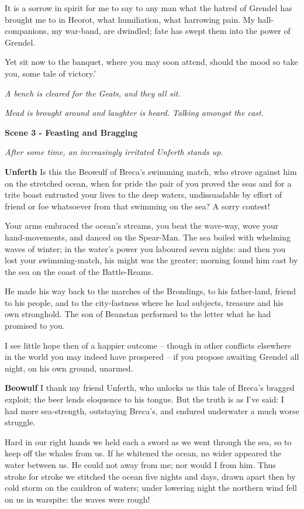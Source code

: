 \documentclass[a4paper]{article}
\begin{document}
{It is a sorrow in spirit for me to say to any man
what the hatred of Grendel has brought me to in Heorot, 
what humiliation, what harrowing pain. 
My hall-companions, my war-band, are dwindled; 
fate has swept them into the power of Grendel.

Yet sit now to the banquet, where you may soon attend,
should the mood so take you, some tale of victory.'

\centerline{\textit{A bench is cleared for the Geats, and they all sit.}}
\centerline{\textit{Mead is brought around and laughter is heard. Talking amongst the cast.}}

\newpage
\centerline{\textbf{Scene 3 - Feasting and Bragging}}
\centerline{\textit{After some time, an increasingly irritated Unferth stands up.}}

\textbf{Unferth} Is this the Beowulf of Breca's swimming match, 
who strove against him on the stretched ocean,
when for pride the pair of you proved the seas
and for a trite boast entrusted your lives
to the deep waters, undissuadable
by effort of friend or foe whatsoever
from that swimming on the sea? A sorry contest!

Your arms embraced the ocean’s streams,
you beat the wave-way, wove your hand-movements,
and danced on the Spear-Man. The sea boiled with whelming
waves of winter; in the water’s power
you laboured seven nights: and then you lost your swimming-match,
his might was the greater; morning found him
cast by the sea on the coast of the Battle-Reams.

He made his way back to the marches of the Brondings,
to his father-land, friend to his people,
and to the city-fastness where he had subjects, treasure
and his own stronghold. The son of Beanstan
performed to the letter what he had promised to you.

I see little hope then of a happier outcome
– though in other conflicts elsewhere in the world
you may indeed have prospered – if you propose awaiting
Grendel all night, on his own ground, unarmed.

\textbf{Beowulf} I thank my friend Unferth, who unlocks us this tale
of Breca's bragged exploit; 
the beer lends eloquence to his tongue.
But the truth is as I've said:
I had more sea-strength, outstaying Breca's,
and endured underwater a much worse struggle.

Hard in our right hands we held each a sword
as we went through the sea, so to keep off
the whales from us. If he whitened the ocean,
no wider appeared the water between us.
He could not away from me; nor would I from him.
Thus stroke for stroke we stitched the ocean
five nights and days, drawn apart then
by cold storm on the cauldron of waters;
under lowering night the northern wind
fell on us in warspite: the waves were rough!

}
\end{document}
